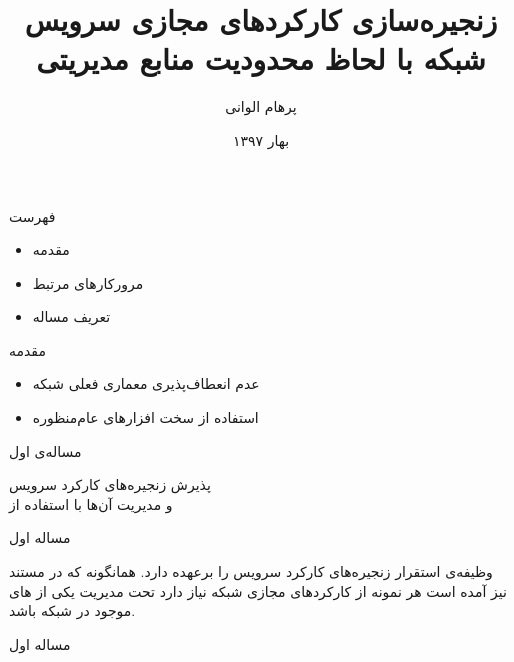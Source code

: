 \documentclass{beamer}
\title{
    زنجیره‌سازی کارکردهای مجازی سرویس شبکه با لحاظ محدودیت منابع مدیریتی
}
\subtitle{}
\author{پرهام الوانی}
\institute{دانشکده مهندسی کامپیوتر و فناوری اطلاعات}
\date{بهار ۱۳۹۷}
\makeatletter
\newcommand{\RTList}{\raggedleft\rightskip\@totalleftmargin}
\makeatother
\begin{document}
\begin{persian}
\begin{frame}
\maketitle
\end{frame}

\everypar{\rightskip\rightmargin}
\begin{frame}{فهرست}
    \begin{itemize}\RTList{}
        \item مقدمه
        \item مرورکارهای مرتبط
        \item تعریف مساله
    \end{itemize}
\end{frame}
\begin{frame}{مقدمه}
    \begin{itemize}\RTList{}
        \item عدم انعطاف‌پذیری معماری فعلی شبکه
        \item استفاده از سخت افزارهای عام‌منظوره
    \end{itemize}
\end{frame}
\begin{frame}
    \begin{multicols}{3}
        \begin{center}	
            مساله‌ی اول
        \end{center}
    \end{multicols}
    \begin{center}	
        پذیرش زنجیره‌های کارکرد سرویس
        \\
        و مدیریت آن‌ها با استفاده از 
    \end{center}
\end{frame}
\begin{frame}{مساله اول}
    \par
     وظیفه‌ی استقرار زنجیره‌های کارکرد سرویس را برعهده دارد.
    همانگونه که در مستند  نیز آمده است هر نمونه از کارکردهای مجازی شبکه نیاز دارد
    تحت مدیریت یکی از های موجود در شبکه باشد.
\end{frame}
\begin{frame}{مساله اول}
    \begin{center}\begin{figure}

\end{figure}
\end{center}
\end{frame}
\end{persian}
\end{document}
